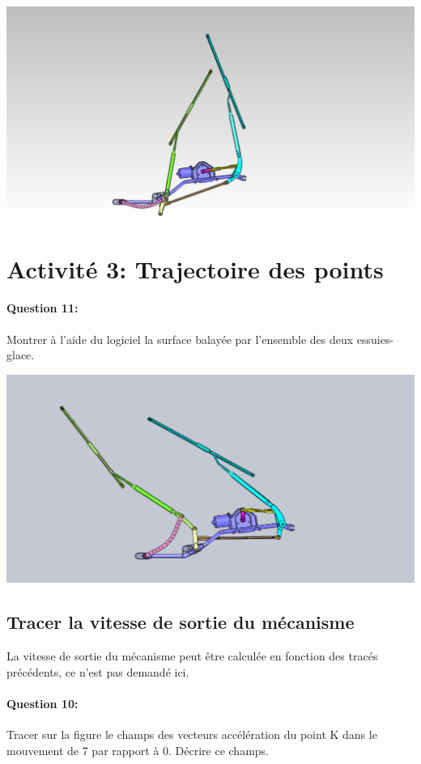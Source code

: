 \vspace{2cm}

\includegraphics[width=0.9\linewidth]{img/essuie_glace_haut}

\section{Activité 3: Trajectoire des points}

\paragraph{Question 11:} Montrer à l'aide du logiciel la surface balayée par l'ensemble des deux essuies-glace.

\vspace{1cm}

\includegraphics[width=0.9\linewidth]{img/essuie_glace}

\subsection{Tracer la vitesse de sortie du mécanisme}

La vitesse de sortie du mécanisme peut être calculée en fonction des tracés précédents, ce n'est pas demandé ici.

\paragraph{Question 10:} Tracer sur la figure le champs des vecteurs accélération du point K dans le mouvement de 7 par rapport à 0. Décrire ce champs.

